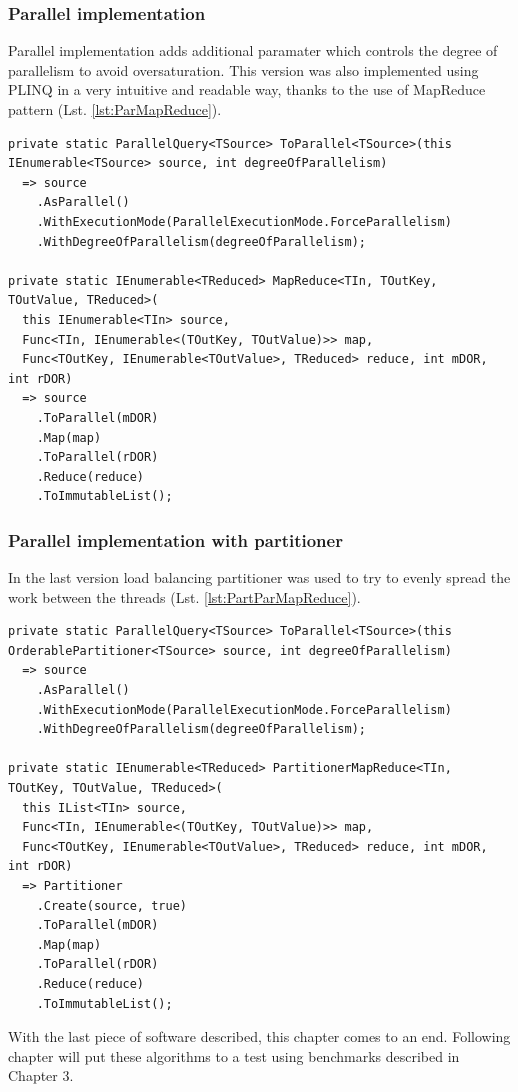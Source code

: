 \subsubsection{Parallel implementation}
Parallel implementation adds additional paramater which controls the degree of parallelism to avoid oversaturation. This version was also implemented using PLINQ in a very intuitive and readable way, thanks to the use of MapReduce pattern (Lst. \ref{lst:ParMapReduce}).

\begin{lstlisting}[language={[sharp]c}, style=sharpcstyle, caption={Parallel MapReduce implementation}, label={lst:ParMapReduce}]
private static ParallelQuery<TSource> ToParallel<TSource>(this IEnumerable<TSource> source, int degreeOfParallelism)
  => source
    .AsParallel()
    .WithExecutionMode(ParallelExecutionMode.ForceParallelism)
    .WithDegreeOfParallelism(degreeOfParallelism);

private static IEnumerable<TReduced> MapReduce<TIn, TOutKey, TOutValue, TReduced>(
  this IEnumerable<TIn> source,
  Func<TIn, IEnumerable<(TOutKey, TOutValue)>> map,
  Func<TOutKey, IEnumerable<TOutValue>, TReduced> reduce, int mDOR, int rDOR)
  => source
    .ToParallel(mDOR)
    .Map(map)
    .ToParallel(rDOR)
    .Reduce(reduce)
    .ToImmutableList();
\end{lstlisting}

\subsubsection{Parallel implementation with partitioner}
In the last version load balancing partitioner was used to try to evenly spread the work between the threads (Lst. \ref{lst:PartParMapReduce}).

\begin{lstlisting}[language={[sharp]c}, style=sharpcstyle, caption={Parallel MapReduce implementation with partitioner}, label={lst:PartParMapReduce}]
private static ParallelQuery<TSource> ToParallel<TSource>(this OrderablePartitioner<TSource> source, int degreeOfParallelism)
  => source
    .AsParallel()
    .WithExecutionMode(ParallelExecutionMode.ForceParallelism)
    .WithDegreeOfParallelism(degreeOfParallelism);

private static IEnumerable<TReduced> PartitionerMapReduce<TIn, TOutKey, TOutValue, TReduced>(
  this IList<TIn> source,
  Func<TIn, IEnumerable<(TOutKey, TOutValue)>> map,
  Func<TOutKey, IEnumerable<TOutValue>, TReduced> reduce, int mDOR, int rDOR)
  => Partitioner
    .Create(source, true)
    .ToParallel(mDOR)
    .Map(map)
    .ToParallel(rDOR)
    .Reduce(reduce)
    .ToImmutableList();
\end{lstlisting}

With the last piece of software described, this chapter comes to an end. Following chapter will put these algorithms to a test using benchmarks described in Chapter 3.


